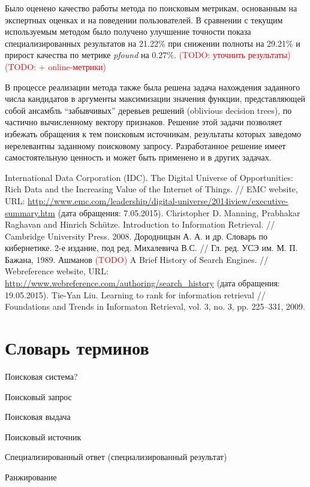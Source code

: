 \documentclass[12pt,a4paper]{report}
\renewcommand{\bibname}{Список литературы}
\newcommand\note[1]{\textcolor{red}{(#1)}}
\newcommand\todonote[1]{\note{TODO: #1}}
\begin{document}
Было оценено качество работы метода по поисковым метрикам, основанным на экспертных оценках и на поведении пользователей. В сравнении с текущим используемым методом было получено улучшение точности показа специализированных результатов на 21.22\% при снижении полноты на 29.21\% и прирост качества по метрике \textit{pfound} на 0.27\%. \todonote{уточнить результаты} \todonote{+ online-метрики}

В процессе реализации метода также была решена задача нахождения заданного числа кандидатов в аргументы максимизации значения функции, представляющей собой ансамбль ``забывчивых'' деревьев решений (oblivious decision trees), по частично вычисленному вектору признаков. Решение этой задачи позволяет избежать обращения к тем поисковым источникам, результаты которых заведомо нерелевантны заданному поисковому запросу. Разработанное решение имеет самостоятельную ценность и может быть применено и в других задачах.

\renewcommand{\bibname}{Список литературы}
\begin{thebibliography}{@}
  International Data Corporation (IDC). The Digital Universe of Opportunities: Rich Data and the Increasing Value of the Internet of Things. // EMC website,
  URL: \url{http://www.emc.com/leadership/digital-universe/2014iview/executive-summary.htm} (дата обращения: 7.05.2015).
  Christopher D. Manning, Prabhakar Raghavan and Hinrich Schütze. Introduction to Information Retrieval. // Cambridge University Press. 2008. %
  Дородницын А. А. и др. Словарь по кибернетике. 2-е издание, под ред. Михалевича В.С. // Гл. ред. УСЭ им. М. П. Бажана, 1989. %
  Ашманов \note{TODO}
  A Brief History of Search Engines. // Webreference website, 
  URL: \url{http://www.webreference.com/authoring/search_history} (дата обращения: 19.05.2015).
  Tie-Yan Liu. Learning to rank for information retrieval // Foundations and Trends in Informaton Retrieval, vol. 3, no. 3, pp. 225–331, 2009.
\end{thebibliography}

\chapter*{Словарь терминов}

Поисковая система?

Поисковый запрос

Поисковая выдача

Поисковый источник

Специализированный ответ (специализированный результат)

Ранжирование
\end{document}
